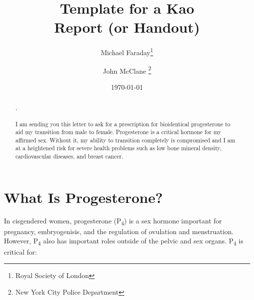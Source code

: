 \documentclass[
	secnumdepth=3, %
]{kaohandt}
\newcommand\tsub[1]{\textsubscript{#1}}
\begin{document}

\title[Template for a Kao Report (or Handout)]{Template for a Kao\\ Report (or Handout)}

\author[MF, JMC]{Michael Faraday\thanks{Royal Society of London} \and John McClane \thanks{New York City Police Department}}

\date{\today}




\begin{abstract}
,\\\\
I am sending you this letter to ask for a prescription for bioidentical progesterone to aid my transition from male to female. Progesterone is a critical hormone for my affirmed sex. Without it, my ability to transition completely is compromised and I am at a heightened risk for severe health problems such as low bone mineral density, cardiovascular diseases, and breast cancer.
\end{abstract}


\medskip


\section{What Is Progesterone?}

In cisgendered women, progesterone (P\tsub{4}) is a sex hormone important for pregnancy, embryogenisis, and the regulation of ovulation and menstruation. However, P\tsub{4} also has important roles outside of the pelvic and sex organs. P\tsub{4} is critical for:
\end{document}
